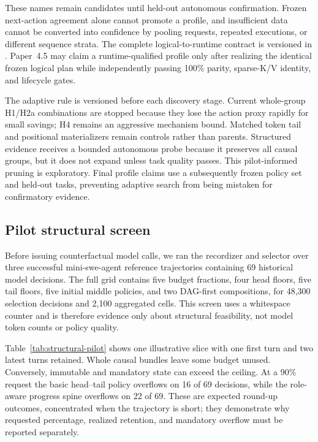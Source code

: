 \documentclass[11pt]{article}
\begin{document}
These names remain candidates until held-out autonomous confirmation. Frozen
next-action agreement alone cannot promote a profile, and insufficient data
cannot be converted into confidence by pooling requests, repeated executions,
or different sequence strata. The complete logical-to-runtime contract is
versioned in . Paper~4.5 may
claim a runtime-qualified profile only after realizing the identical frozen
logical plan while independently passing 100\% parity, sparse-K/V identity, and
lifecycle gates.

The adaptive rule is versioned before each discovery stage. Current whole-group
H1/H2a combinations are stopped because they lose the action proxy rapidly for
small savings; H4 remains an aggressive mechanism bound. Matched token tail
and positional materializers remain controls rather than parents. Structured
evidence receives a bounded autonomous probe because it preserves all causal
groups, but it does not expand unless task quality passes. This pilot-informed
pruning is exploratory. Final profile claims use a subsequently frozen policy
set and held-out tasks, preventing adaptive search from being mistaken for
confirmatory evidence.

\subsection{Pilot structural screen}

Before issuing counterfactual model calls, we ran the recordizer and selector
over three successful mini-swe-agent reference trajectories containing 69
historical model decisions. The full grid contains five budget fractions, four
head floors, five tail floors, five initial middle policies, and two DAG-first
compositions, for 48,300 selection decisions and 2,100 aggregated cells. This
screen uses a whitespace
counter and is therefore evidence only about structural feasibility, not model
token counts or policy quality.

Table~\ref{tab:structural-pilot} shows one illustrative slice with one first
turn and two latest turns retained. Whole causal bundles leave some budget
unused. Conversely, immutable and mandatory state can exceed the ceiling. At a
90\% request the basic head--tail policy overflows on 16 of 69 decisions, while
the role-aware progress spine overflows on 22 of 69. These are expected
round-up outcomes, concentrated when the trajectory is short; they demonstrate
why requested percentage, realized retention, and mandatory overflow must be
reported separately.
\end{document}
